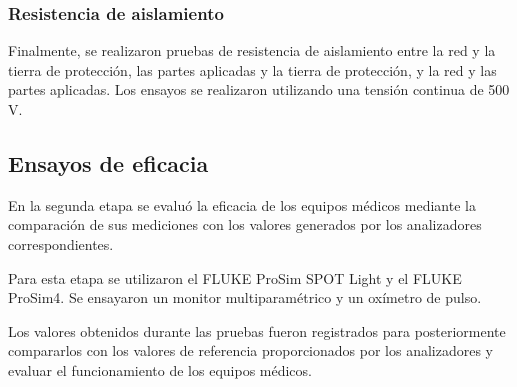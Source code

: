 \subsubsection{Resistencia de aislamiento}

Finalmente, se realizaron pruebas de resistencia de aislamiento entre la red y la tierra de protección, las partes aplicadas y la tierra de protección, y la red y las partes aplicadas. Los ensayos se realizaron utilizando una tensión continua de 500 V.

\subsection{Ensayos de eficacia}

En la segunda etapa se evaluó la eficacia de los equipos médicos mediante la comparación de sus mediciones con los valores generados por los analizadores correspondientes.

Para esta etapa se utilizaron el FLUKE ProSim SPOT Light y el FLUKE ProSim4. Se ensayaron un monitor multiparamétrico y un oxímetro de pulso.

Los valores obtenidos durante las pruebas fueron registrados para posteriormente compararlos con los valores de referencia proporcionados por los analizadores y evaluar el funcionamiento de los equipos médicos.